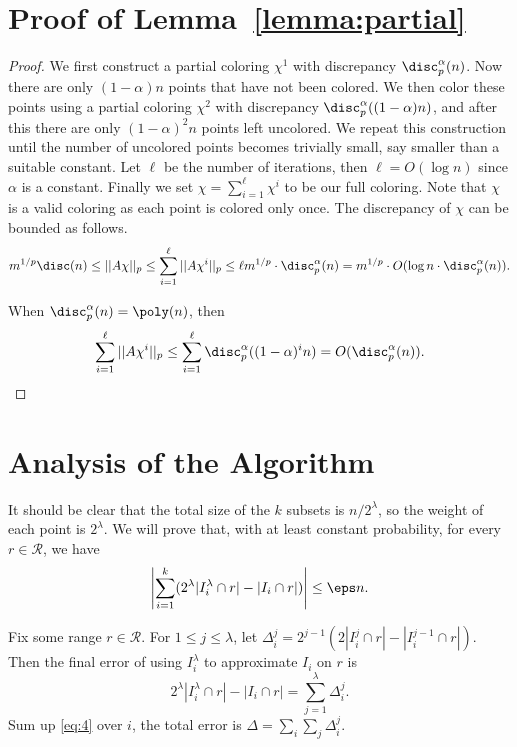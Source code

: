 \appendix

\section{Proof of Lemma~\ref{lemma:partial}}\label{app1}

\begin{proof} 
We first construct a partial coloring $\chi^1$ with discrepancy
$\disc_p^\alpha(n)$. Now there are only $(1-\alpha)n$ points that have not been
colored. We then color these points using a partial coloring $\chi^2$ with discrepancy
$\disc_p^\alpha((1-\alpha)n)$, and after this there are only $(1-\alpha)^2n$ points
left uncolored. We repeat this construction until the number of uncolored points
becomes trivially small, say smaller than a suitable constant. Let $\ell$ be the number
of iterations, then $\ell=O( \log n)$ since $\alpha$ is a constant. Finally we set
$\chi=\sum_{i=1}^\ell \chi^i$ to be our full coloring. Note that $\chi$ is a valid
coloring as each point is colored only once. The discrepancy of $\chi$ can be bounded
as follows. 
$$m^{1/p}\disc(n)\le ||A\chi||_p\le \sum_{i=1}^\ell ||A\chi^i||_p\le \ell
m^{1/p}\cdot\disc_p^\alpha(n)= m^{1/p}\cdot O(\log n \cdot \disc_p^\alpha(n)).$$

When $\disc_p^\alpha(n) = \poly(n)$, then
$$\sum_{i=1}^\ell ||A\chi^i||_p \le \sum_{i=1}^\ell \disc_p^\alpha((1-\alpha)^i n) = O(\disc_p^\alpha (n)).$$
\end{proof}

\section{Analysis of the Algorithm}\label{app2}
It should be clear that the total size of the $k$ subsets is $n/2^\lambda$, so the weight
of each point is $2^\lambda$.  We will prove that, with at least constant probability, for
every $r\in \mathcal{R}$, we have
$$\left|\sum_{i=1}^k( 2^\lambda|I_i^\lambda\cap r|-|I_i\cap r|)\right|\le \eps n.$$

Fix some range $r\in \mathcal{R}$.  For $1\le j\le \lambda$, let
$\Delta_i^j=2^{j-1}(2|I_i^j\cap r|-|I_i^{j-1}\cap r|)$.  Then the final error of using
$I_i^\lambda$ to approximate $I_i$ on $r$ is
\begin{equation}
  \label{eq:4}
2^\lambda|I_i^\lambda\cap r|-|I_i\cap r| = \sum_{j=1}^\lambda \Delta_i^j.
\end{equation}
Sum up \eqref{eq:4} over $i$, the total error is $\Delta=\sum_i\sum_j \Delta_i^j$.

